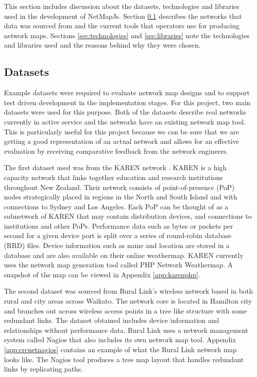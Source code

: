 \documentclass[11pt, a4paper]{article}
\begin{document}
This section includes discussion about the datasets, technologies and libraries
used in the development of NetMapJs. Section \ref{sec:datasets} describes the
networks that data was sourced from and the current tools that operators use for
producing network maps. Sections \ref{sec:technologies} and \ref{sec:libraries}
note the technologies and libraries used and the reasons behind why they were
chosen.

\subsection{Datasets}
\label{sec:datasets}

Example datasets were required to evaluate network map designs and to support
test driven development in the implementation stages. For this project, two main
datasets were used for this purpose. Both of the datasets describe real networks
currently in active service and the networks have an existing network map tool.
This is particularly useful for this project because we can be sure that we are
getting a good representation of an actual network and allows for an effective
evaluation by receiving comparative feedback from the network engineers. 

The first dataset used was from the KAREN network \cite{KAREN_website}. KAREN is
a high capacity network that links together education and research institutions
throughout New Zealand. Their network consists of point-of-presence (PoP) nodes
strategically placed in regions in the North and South Island and with
connections to Sydney and Los Angeles. Each PoP can be thought of as a
subnetwork of KAREN that may contain distribution devices, and connections to
institutions and other PoPs.  Performance data such as bytes or packets per
second for a given device port is split over a series of round-robin database
(RRD) files. Device information such as name and location are stored in a
database and are also available on their online weathermap. KAREN currently uses
the network map generation tool called PHP Network Weathermap. A snapshot of the
map can be viewed in Appendix \ref{app:karenphp}.


The second dataset was sourced from Rural Link's wireless network based in both
rural and city areas across Waikato. The network core is located in Hamilton
city and branches out across wireless access points in a tree like structure
with some redundant links. The dataset obtained includes device information and
relationships without performance data. Rural Link uses a network management
system called Nagios that also includes its own network map tool. Appendix
\ref{app:crcnetnagios} contains an example of what the Rural Link network map
looks like. The Nagios tool produces a tree map layout that handles redundant
links by replicating paths.
\end{document}
